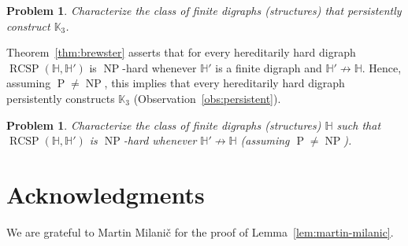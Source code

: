 \documentclass{article}
\newtheorem{problem}[question]{Problem}
\theoremstyle{definition}
\theoremstyle{remark}
\DeclareMathOperator{\NP}{NP}
\DeclareMathOperator{\cP}{P}
\DeclareMathOperator{\RCSP}{RCSP}
\newcommand{\bH}{{\mathbb H}}
\newcommand{\bK}{{\mathbb K}}
\begin{document}
\begin{problem}
    Characterize the class of finite digraphs (structures) that persistently construct $\bK_3$.
\end{problem}

Theorem~\ref{thm:brewster} asserts that for every hereditarily hard digraph $\RCSP(\bH,\bH')$
is $\NP$-hard whenever $\bH'$ is a finite digraph and $\bH'\not\to\bH$. Hence, assuming
$\cP\neq \NP$, this implies that every hereditarily hard digraph persistently constructs
$\bK_3$ (Observation~\ref{obs:persistent}).

\begin{problem}
    Characterize the class of finite digraphs (structures) $\bH$ such that $\RCSP(\bH,\bH')$
    is $\NP$-hard whenever $\bH'\not\to \bH$ (assuming $\cP\neq \NP$).
\end{problem}

\section*{Acknowledgments}
We are grateful to Martin Milani\v{c} for the proof of Lemma~\ref{lem:martin-milanic}.




\end{document}
